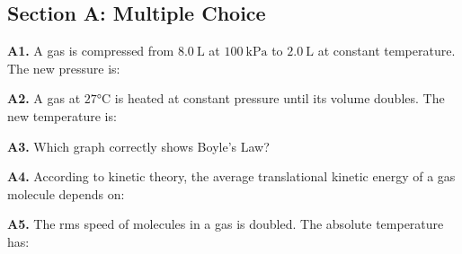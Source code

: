 \newpage
\begin{exercisebox}[14]

\subsection*{Section A: Multiple Choice}

\textbf{A1.} A gas is compressed from $8.0\ \text{L}$
at $100\ \text{kPa}$ to $2.0\ \text{L}$ at constant
temperature. The new pressure is:


\vspace{0.4cm}

\textbf{A2.} A gas at $27°\text{C}$ is heated at
constant pressure until its volume doubles. The
new temperature is:


\vspace{0.4cm}

\textbf{A3.} Which graph correctly shows Boyle's
Law?


\vspace{0.4cm}

\textbf{A4.} According to kinetic theory, the
average translational kinetic energy of a gas
molecule depends on:


\vspace{0.4cm}

\textbf{A5.} The rms speed of molecules in a gas
is doubled. The absolute temperature has:


\vspace{0.4cm}


\end{exercisebox}
